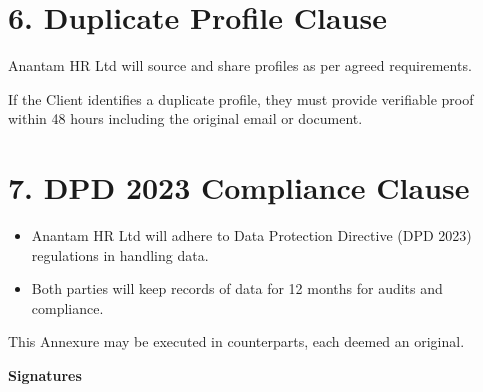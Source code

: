 \documentclass{article}
\begin{document}
\section*{6. Duplicate Profile Clause}

Anantam HR Ltd will source and share profiles as per agreed requirements.

If the Client identifies a duplicate profile, they must provide verifiable proof within 48 hours including the original email or document.

\section*{7. DPD 2023 Compliance Clause}

\begin{itemize}
\item Anantam HR Ltd will adhere to Data Protection Directive (DPD 2023) regulations in handling data.
\item Both parties will keep records of data for 12 months for audits and compliance.
\end{itemize}

\bigskip
This Annexure may be executed in counterparts, each deemed an original.

\bigskip
\textbf{Signatures}
\end{document}
